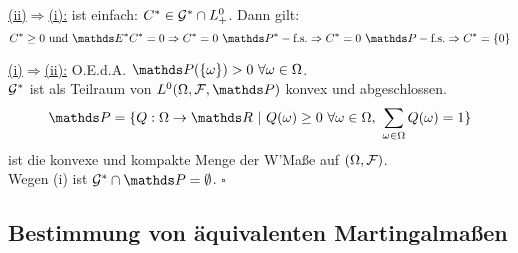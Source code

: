 \\
\uline{(ii)$\Rightarrow$(i):}
ist einfach: $C^*\in\mathcal{G}^*\cap L_+^0$.
Dann gilt:
\[
C^*\ge 0\text{ und } \E^*C^*=0\Rightarrow C^*=0~ \Pfs[*]\Rightarrow C^*=0~ \Pfs \Rightarrow C^*=\{0\}
\]

\uline{(i)$\Rightarrow$(ii):}
O.E.d.A. $\Pw(\{\omega\})>0~\forall \omega\in \Omega$.\\
$\mathcal{G}^*$ ist als Teilraum von $L^0(\Omega,\F,\Pw)$ konvex und abgeschlossen.
\[
\Pw=\{Q:\Omega\to \R~|~Q(\omega)\ge 0~\forall \omega\in \Omega,~\sum_{\omega\in \Omega}Q(\omega)=1 \}
\]
ist die konvexe und kompakte Menge der W'Maße auf $(\Omega,\mathcal{F})$.\\
Wegen (i) ist $\G^*\cap\Pw=\emptyset$.
\hfill $\square$


\subsection{Bestimmung von äquivalenten Martingalmaßen}
\label{sub:bestimmung_mmase}
